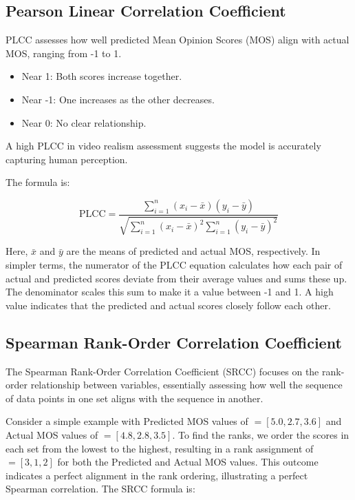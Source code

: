 \documentclass[a4paper,12pt,openright]{book}
\begin{document}
\subsection{Pearson Linear Correlation Coefficient}

PLCC assesses how well predicted Mean Opinion Scores (MOS) align with actual MOS, ranging from -1 to 1.

\begin{itemize}
    \item Near 1: Both scores increase together.
    \item Near -1: One increases as the other decreases.
    \item Near 0: No clear relationship.
\end{itemize}

A high PLCC in video realism assessment suggests the model is accurately capturing human perception.

The formula is:

\[
\text{PLCC} = \frac{\sum_{i=1}^{n}{(x_i - \bar{x})(y_i - \bar{y})}}{\sqrt{\sum_{i=1}^{n}{(x_i - \bar{x})^2} \sum_{i=1}^{n}{(y_i - \bar{y})^2}}}
\]

Here, \( \bar{x} \) and \( \bar{y} \) are the means of predicted and actual MOS, respectively.
In simpler terms, the numerator of the PLCC equation calculates how each pair of actual and predicted scores deviate from their average values and sums these up. The denominator scales this sum to make it a value between -1 and 1. A high value indicates that the predicted and actual scores closely follow each other.

\subsection{Spearman Rank-Order Correlation Coefficient}

The Spearman Rank-Order Correlation Coefficient (SRCC) focuses on the rank-order relationship between variables, essentially assessing how well the sequence of data points in one set aligns with the sequence in another. 

Consider a simple example with Predicted MOS values of \(= [5.0, 2.7, 3.6]\) and Actual MOS values of \(= [4.8, 2.8, 3.5]\). To find the ranks, we order the scores in each set from the lowest to the highest, resulting in a rank assignment of \(= [3, 1, 2]\) for both the Predicted and Actual MOS values. This outcome indicates a perfect alignment in the rank ordering, illustrating a perfect Spearman correlation.
The SRCC formula is:
\end{document}
